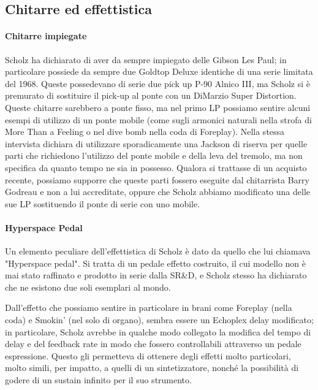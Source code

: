 \documentclass[class=book, crop=false, oneside, 12pt]{standalone}
\begin{document}
\subsection{Chitarre ed effettistica}
\paragraph{Chitarre impiegate}
Scholz ha dichiarato di aver da sempre impiegato delle Gibson Les Paul; in particolare possiede da sempre due Goldtop Deluxe identiche di una serie limitata del 1968\cite{site:musicradar_gear}. Queste possedevano di serie due pick up P-90 Alnico III, ma Scholz si è premurato di sostituire il pick-up al ponte con un DiMarzio Super Distortion. Queste chitarre sarebbero a ponte fisso, ma nel primo LP possiamo sentire alcuni esempi di utilizzo di un ponte mobile (come sugli armonici naturali nella strofa di More Than a Feeling o nel dive bomb nella coda di Foreplay). Nella stessa intervista dichiara di utilizzare sporadicamente una Jackson di riserva per quelle parti che richiedono l'utilizzo del ponte mobile e della leva del tremolo, ma non specifica da quanto tempo ne sia in possesso\cite{site:musicradar_gear}. Qualora si trattasse di un acquisto recente, possiamo supporre che queste parti fossero eseguite dal chitarrista Barry Godreau e non a lui accreditate, oppure che Scholz abbiamo modificato una delle sue LP sostituendo il ponte di serie con uno mobile.

\paragraph{Hyperspace Pedal}
Un elemento peculiare dell'effettistica di Scholz è dato da quello che lui chiamava "Hyperspace pedal". Si tratta di un pedale effetto costruito, il cui modello non è mai stato raffinato e prodotto in serie dalla SR\&D, e Scholz stesso ha dichiarato che ne esistono due soli esemplari al mondo\cite{yt:scholz_sound}.

Dall'effetto che possiamo sentire in particolare in brani come Foreplay (nella coda) e Smokin' (nel solo di organo), sembra essere un Echoplex delay modificato; in particolare, Scholz avrebbe in qualche modo collegato la modifica del tempo di delay e del feedback rate in modo che fossero controllabili attraverso un pedale espressione. Questo gli permetteva di ottenere degli effetti molto particolari, molto simili, per impatto, a quelli di un sintetizzatore, nonché la possibilità di godere di un sustain infinito per il suo strumento\cite{yt:scholz_sound}.
\end{document}
